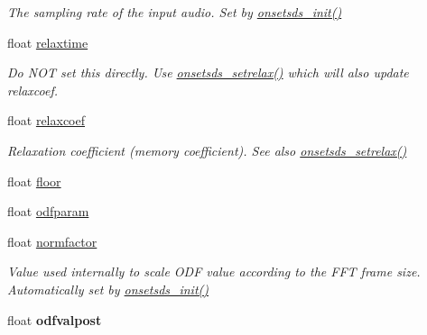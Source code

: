 \begin{DoxyCompactItemize}
\begin{DoxyCompactList}\small\item\em \-The sampling rate of the input audio. \-Set by \hyperlink{group__MainUserFuncs_gab23ae57d91a4ea14c4603243c84a7ed6}{onsetsds\-\_\-init()} \end{DoxyCompactList}\item 
\hypertarget{structOnsetsDS_ac2df5ff5d39f4f467d0a0a694e89512a}{float \hyperlink{structOnsetsDS_ac2df5ff5d39f4f467d0a0a694e89512a}{relaxtime}}\label{structOnsetsDS_ac2df5ff5d39f4f467d0a0a694e89512a}

\begin{DoxyCompactList}\small\item\em \-Do \-N\-O\-T set this directly. \-Use \hyperlink{group__LessCommonFuncs_gac1172605b8b821d0eff6cc1efdd8ce6c}{onsetsds\-\_\-setrelax()} which will also update relaxcoef. \end{DoxyCompactList}\item 
\hypertarget{structOnsetsDS_a685d45e4d30195d8c14447f5da7af85e}{float \hyperlink{structOnsetsDS_a685d45e4d30195d8c14447f5da7af85e}{relaxcoef}}\label{structOnsetsDS_a685d45e4d30195d8c14447f5da7af85e}

\begin{DoxyCompactList}\small\item\em \-Relaxation coefficient (memory coefficient). \-See also \hyperlink{group__LessCommonFuncs_gac1172605b8b821d0eff6cc1efdd8ce6c}{onsetsds\-\_\-setrelax()} \end{DoxyCompactList}\item 
float \hyperlink{structOnsetsDS_a0c4f6f0751dca3301396169571a5e702}{floor}
\item 
float \hyperlink{structOnsetsDS_ab42f8cdea87d089218e078442475edb0}{odfparam}
\item 
\hypertarget{structOnsetsDS_aba3456b119c5295c12ccb1a02d4861f9}{float \hyperlink{structOnsetsDS_aba3456b119c5295c12ccb1a02d4861f9}{normfactor}}\label{structOnsetsDS_aba3456b119c5295c12ccb1a02d4861f9}

\begin{DoxyCompactList}\small\item\em \-Value used internally to scale \-O\-D\-F value according to the \-F\-F\-T frame size. \-Automatically set by \hyperlink{group__MainUserFuncs_gab23ae57d91a4ea14c4603243c84a7ed6}{onsetsds\-\_\-init()} \end{DoxyCompactList}\item 
\hypertarget{structOnsetsDS_af4c17041fbbb57bcf19995c77e843e0d}{float {\bfseries odfvalpost}}\label{structOnsetsDS_af4c17041fbbb57bcf19995c77e843e0d}


\end{DoxyCompactItemize}
